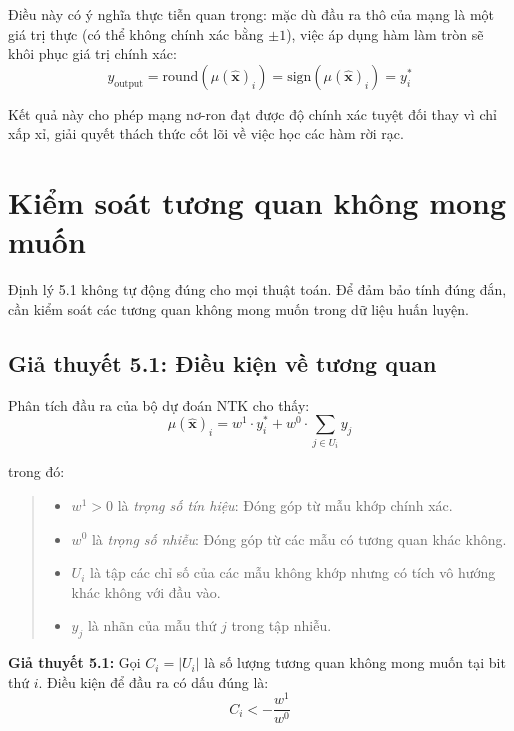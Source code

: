 Điều này có ý nghĩa thực tiễn quan trọng: mặc dù đầu ra thô của mạng là một giá trị thực (có thể không chính xác bằng $\pm 1$), việc áp dụng hàm làm tròn sẽ khôi phục giá trị chính xác:
\begin{equation}
    y_{\text{output}} = \text{round}(\mu(\hat{\mathbf{x}})_i) = \text{sign}(\mu(\hat{\mathbf{x}})_i) = y_i^*
\end{equation}

Kết quả này cho phép mạng nơ-ron đạt được độ chính xác tuyệt đối thay vì chỉ xấp xỉ, giải quyết thách thức cốt lõi về việc học các hàm rời rạc.

\section{Kiểm soát tương quan không mong muốn}

Định lý 5.1 không tự động đúng cho mọi thuật toán. Để đảm bảo tính đúng đắn, cần kiểm soát các tương quan không mong muốn trong dữ liệu huấn luyện.

\subsection{Giả thuyết 5.1: Điều kiện về tương quan}

Phân tích đầu ra của bộ dự đoán NTK cho thấy:
\begin{equation}
    \mu(\hat{\mathbf{x}})_i = w^1 \cdot y_i^* + w^0 \cdot \sum_{j \in U_i} y_j
\end{equation}

trong đó:
\begin{quote}
\begin{itemize}
    \item $w^1 > 0$ là \textit{trọng số tín hiệu}: Đóng góp từ mẫu khớp chính xác.
    \item $w^0$ là \textit{trọng số nhiễu}: Đóng góp từ các mẫu có tương quan khác không.
    \item $U_i$ là tập các chỉ số của các mẫu không khớp nhưng có tích vô hướng khác không với đầu vào.
    \item $y_j$ là nhãn của mẫu thứ $j$ trong tập nhiễu.
\end{itemize}
\end{quote}

        \textbf{Giả thuyết 5.1:} Gọi $C_i = |U_i|$ là số lượng tương quan không mong muốn tại bit thứ $i$. Điều kiện để đầu ra có dấu đúng là:
\begin{equation}
    C_i < -\frac{w^1}{w^0}
\end{equation}

